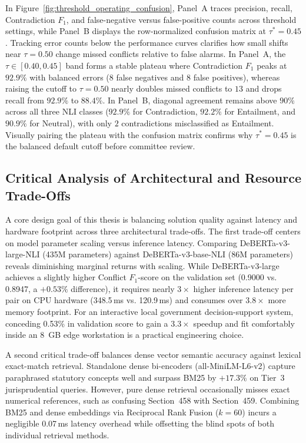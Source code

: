 In Figure~\ref{fig:threshold_operating_confusion}, Panel~A traces precision, recall, Contradiction $F_1$, and false-negative versus false-positive counts across threshold settings, while Panel~B displays the row-normalized confusion matrix at $\tau^* = 0.45$. Tracking error counts below the performance curves clarifies how small shifts near $\tau = 0.50$ change missed conflicts relative to false alarms. In Panel~A, the $\tau \in [0.40, 0.45]$ band forms a stable plateau where Contradiction $F_1$ peaks at $92.9\%$ with balanced errors ($8$ false negatives and $8$ false positives), whereas raising the cutoff to $\tau = 0.50$ nearly doubles missed conflicts to $13$ and drops recall from $92.9\%$ to $88.4\%$. In Panel~B, diagonal agreement remains above $90\%$ across all three NLI classes ($92.9\%$ for Contradiction, $92.2\%$ for Entailment, and $90.9\%$ for Neutral), with only $2$ contradictions misclassified as Entailment. Visually pairing the plateau with the confusion matrix confirms why $\tau^* = 0.45$ is the balanced default cutoff before committee review.


\subsection{Critical Analysis of Architectural and Resource Trade-Offs}
\label{sec:tradeoff_analysis}

A core design goal of this thesis is balancing solution quality against latency and hardware footprint across three architectural trade-offs. The first trade-off centers on model parameter scaling versus inference latency. Comparing DeBERTa-v3-large-NLI (435M parameters) against DeBERTa-v3-base-NLI (86M parameters) reveals diminishing marginal returns with scaling. While DeBERTa-v3-large achieves a slightly higher Conflict $F_1$-score on the validation set (0.9000 vs. 0.8947, a $+0.53\%$ difference), it requires nearly $3\times$ higher inference latency per pair on CPU hardware (348.5\,ms vs. 120.9\,ms) and consumes over $3.8\times$ more memory footprint. For an interactive local government decision-support system, conceding 0.53\% in validation score to gain a $3.3\times$ speedup and fit comfortably inside an 8~GB edge workstation is a practical engineering choice.

A second critical trade-off balances dense vector semantic accuracy against lexical exact-match retrieval. Standalone dense bi-encoders (all-MiniLM-L6-v2) capture paraphrased statutory concepts well and surpass BM25 by $+17.3\%$ on Tier~3 jurisprudential queries. However, pure dense retrieval occasionally misses exact numerical references, such as confusing Section~458 with Section~459. Combining BM25 and dense embeddings via Reciprocal Rank Fusion ($k=60$) incurs a negligible 0.07\,ms latency overhead while offsetting the blind spots of both individual retrieval methods.

